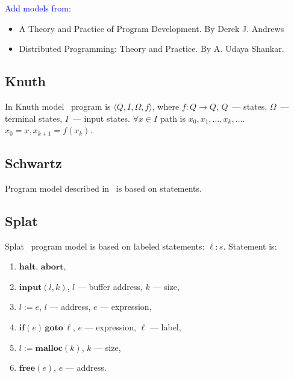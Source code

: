 \documentclass[fleqn,oneside,a4]{article}
\newcommand{\sublevel}{\subsection}
\newcommand{\comment}[1]{\textcolor{blue}{#1}}  %
\newcommand{\ra}{\rightarrow}
\begin{document}
\comment{Add models from:}
\begin{itemize}
    \item A Theory and Practice of Program Development.
        By Derek J. Andrews
    \item Distributed Programming: Theory and Practice.
        By A. Udaya Shankar.
\end{itemize}

\sublevel{Knuth}

In Knuth model~\cite{knuth} program is $\langle Q, I, \Omega, f \rangle$,
where $f: Q \ra Q$, $Q$~--- states, $\Omega$~--- terminal states,
$I$~--- input states.
$\forall x \in I$ path is $x_0, x_1, \dots, x_k, \dots$.
$x_0 = x, x_{k + 1} = f(x_k)$.

\sublevel{Schwartz}

Program model described in~\cite{dta_fse} is based on statements.

\sublevel{Splat}

Splat~\cite{splat} program model is based on labeled statements: $\ell: s$.
Statement is:
\begin{enumerate}[itemsep=-0.5ex]
    \item $\textbf{halt}$, $\textbf{abort}$,
    \item $\textbf{input}(l, k)$, $l$ --- buffer address, $k$ --- size,
    \item $l := e$, $l$ --- address, $e$ --- expression,
    \item $\textbf{if}(e)\,\textbf{goto}\, \ell$, $e$ --- expression,
        $\ell$ --- label,
    \item $l := \textbf{malloc}(k)$, $k$ --- size,
    \item $\textbf{free}(e)$, $e$ --- address.
\end{enumerate}


{}

\end{document}
